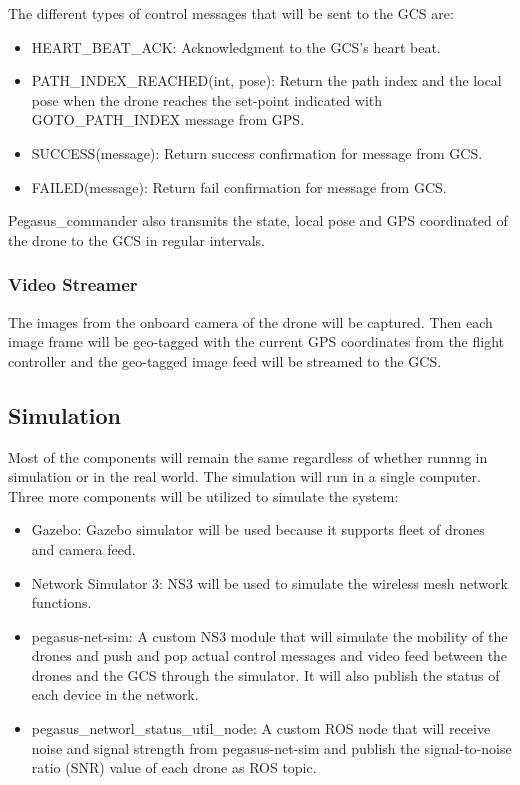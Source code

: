 The different types of control messages that will be sent to the GCS are:
\begin{itemize}
  \item HEART\_BEAT\_ACK: Acknowledgment to the GCS's heart beat.
  \item PATH\_INDEX\_REACHED(int, pose): Return the path index and the local pose when the drone reaches the set-point indicated with GOTO\_PATH\_INDEX message from GPS.
  \item SUCCESS(message): Return success confirmation for message from GCS.
  \item FAILED(message): Return fail confirmation for message from GCS.
\end{itemize}

Pegasus\_commander also transmits the state, local pose and GPS coordinated of the drone to the GCS in regular intervals.

\subsubsection{Video Streamer}

The images from the onboard camera of the drone will be captured. Then each image frame will be geo-tagged with the current GPS coordinates from the flight controller and the geo-tagged image feed will be streamed to the GCS.

\subsection{Simulation}

Most of the components will remain the same regardless of whether runnng in simulation or in the real world. The simulation will run in a single computer. Three more components will be utilized to simulate the system:
\begin{itemize}
  \item Gazebo: Gazebo simulator will be used because it supports fleet of drones and camera feed.
  \item Network Simulator 3: NS3 will be used to simulate the wireless mesh network functions.
  \item pegasus-net-sim: A custom NS3 module that will simulate the mobility of the dro\textsc{}nes and push and pop actual control messages and video feed between the drones and the GCS through the simulator. It will also publish the status of each device in the network.
  \item pegasus\_networl\_status\_util\_node: A custom ROS node that will receive noise and signal strength from pegasus-net-sim and publish the signal-to-noise ratio (SNR) value of each drone as ROS topic.
\end{itemize}

